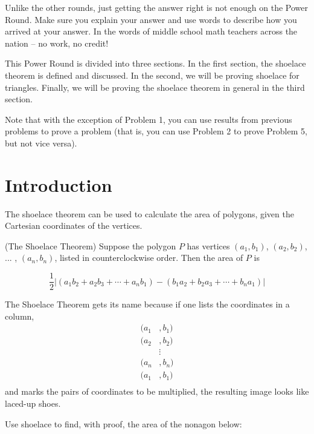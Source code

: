 \documentclass[11pt]{article}
\begin{document}
Unlike the other rounds, just getting the answer right is not enough on the Power Round. Make sure you explain your answer and use words
to describe how you arrived at your answer. In the words of middle school math teachers across the nation -- no work, no credit!

This Power Round is divided into three sections. In the first section, the shoelace theorem is defined and discussed. In the second, we will be proving shoelace for triangles. Finally, we will be proving the shoelace theorem in general in the third section.

Note that with the exception of Problem 1, you can use results from previous problems to prove a problem (that is, you can use Problem 2 to prove Problem 5, but not vice versa). 

\section{Introduction}

The shoelace theorem can be used to calculate the area of polygons, given the Cartesian coordinates of the vertices. 

\begin{theorem} (The Shoelace Theorem) Suppose the polygon $P$ has vertices $(a_1, b_1)$, $(a_2, b_2)$, ... , $(a_n, b_n)$, listed in counterclockwise order. Then the area of $P$ is

\[\dfrac{1}{2} |(a_1b_2 + a_2b_3 + \cdots + a_nb_1) - (b_1a_2 + b_2a_3 + \cdots + b_na_1)|\]
\end{theorem}

The Shoelace Theorem gets its name because if one lists the coordinates in a column, 
\begin{align*} 
(a_1 &, b_1) \\ 
(a_2 &, b_2) \\ 
& \vdots \\ 
(a_n &, b_n) \\ 
(a_1 &, b_1) \\ 
\end{align*} 
and marks the pairs of coordinates to be multiplied, the resulting image looks like laced-up shoes.


\begin{problem}
Use shoelace to find, with proof, the area of the nonagon below:
\begin{center}
\end{center}
\end{problem}
\end{document}
